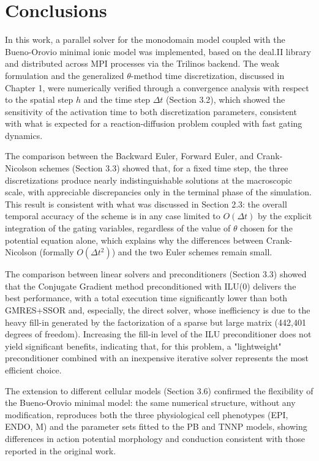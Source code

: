 \documentclass{Configuration_Files/PoliMi3i_thesis}
\begin{document}
\chapter{Conclusions}
In this work, a parallel solver for the monodomain model coupled with the
Bueno-Orovio minimal ionic model was implemented, based on the deal.II
library and distributed across MPI processes via the Trilinos backend. The
weak formulation and the generalized $\theta$-method time discretization,
discussed in Chapter 1, were numerically verified through a convergence
analysis with respect to the spatial step $h$ and the time step $\Delta t$
(Section 3.2), which showed the sensitivity of the activation time to both
discretization parameters, consistent with what is expected for a
reaction-diffusion problem coupled with fast gating dynamics.

The comparison between the Backward Euler, Forward Euler, and Crank-Nicolson
schemes (Section 3.3) showed that, for a fixed time step, the three
discretizations produce nearly indistinguishable solutions at the
macroscopic scale, with appreciable discrepancies only in the terminal phase
of the simulation. This result is consistent with what was discussed in
Section 2.3: the overall temporal accuracy of the scheme is in any case
limited to $O(\Delta t)$ by the explicit integration of the gating
variables, regardless of the value of $\theta$ chosen for the potential
equation alone, which explains why the differences between Crank-Nicolson
(formally $O(\Delta t^2)$) and the two Euler schemes remain small.

The comparison between linear solvers and preconditioners (Section 3.3)
showed that the Conjugate Gradient method preconditioned with ILU(0)
delivers the best performance, with a total execution time significantly
lower than both GMRES+SSOR and, especially, the direct solver, whose
inefficiency is due to the heavy fill-in generated by the factorization of a
sparse but large matrix (442,401 degrees of freedom). Increasing the fill-in
level of the ILU preconditioner does not yield significant benefits,
indicating that, for this problem, a "lightweight" preconditioner combined
with an inexpensive iterative solver represents the most efficient choice.

The extension to different cellular models (Section 3.6) confirmed the
flexibility of the Bueno-Orovio minimal model: the same numerical structure,
without any modification, reproduces both the three physiological cell
phenotypes (EPI, ENDO, M) and the parameter sets fitted to the PB and TNNP
models, showing differences in action potential morphology and conduction
consistent with those reported in the original work.
\end{document}
